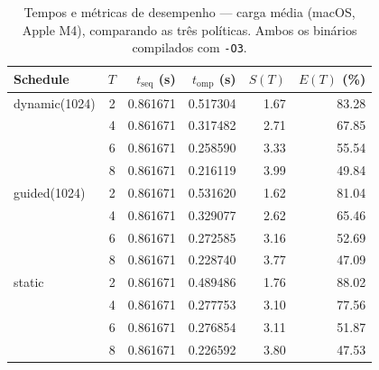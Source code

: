 \documentclass[12pt,a4paper]{article}
\begin{document}
\begin{table}[H]
\centering\small
\caption{Tempos e métricas de desempenho --- carga média (macOS, Apple M4), comparando as três políticas. Ambos os binários compilados com \texttt{-O3}.}
\begin{tabular}{lrrrrr}
\toprule
\textbf{Schedule} & $T$ & $t_{\mathrm{seq}}$ (s) & $t_{\mathrm{omp}}$ (s) & $S(T)$ & $E(T)$ (\%) \\
\midrule
dynamic(1024) & 2 & 0.861671 & 0.517304 & 1.67 & 83.28 \\
              & 4 & 0.861671 & 0.317482 & 2.71 & 67.85 \\
              & 6 & 0.861671 & 0.258590 & 3.33 & 55.54 \\
              & 8 & 0.861671 & 0.216119 & 3.99 & 49.84 \\
\midrule
guided(1024)  & 2 & 0.861671 & 0.531620 & 1.62 & 81.04 \\
              & 4 & 0.861671 & 0.329077 & 2.62 & 65.46 \\
              & 6 & 0.861671 & 0.272585 & 3.16 & 52.69 \\
              & 8 & 0.861671 & 0.228740 & 3.77 & 47.09 \\
\midrule
static        & 2 & 0.861671 & 0.489486 & 1.76 & 88.02 \\
              & 4 & 0.861671 & 0.277753 & 3.10 & 77.56 \\
              & 6 & 0.861671 & 0.276854 & 3.11 & 51.87 \\
              & 8 & 0.861671 & 0.226592 & 3.80 & 47.53 \\
\bottomrule
\end{tabular}
\end{table}
\end{document}
